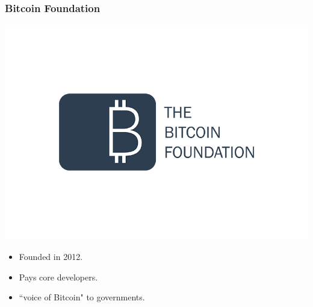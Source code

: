 \documentclass{beamer}
\begin{document}
\begin{frame}
  \frametitle{Bitcoin Foundation}
  	\includegraphics[scale=0.2]{Bitcoin-Foundation}
  	\begin{itemize}
  		\item Founded in 2012.
  		\item Pays core developers.
  		\item ``voice of Bitcoin" to governments.
  	\end{itemize}
\end{frame}
\end{document}
